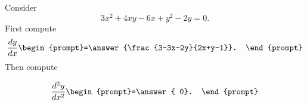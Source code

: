\documentclass{ximera}
\author{Steven Gubkin\and Nela Lakos}
\begin{document}
\begin{exercise}

Consider
\[
3x^2+4xy-6x+ y^2-2y=0.
\]
First compute
\[
\frac{dy}{dx} \begin{prompt}=\answer{\frac{3-3x-2y}{2x+y-1}}.
\end{prompt}
\]
Then compute

\[
\frac{d^2y}{dx^2}  \begin{prompt}=\answer{ 0}.
\end{prompt}
\]

\end{exercise}
\end{document}
